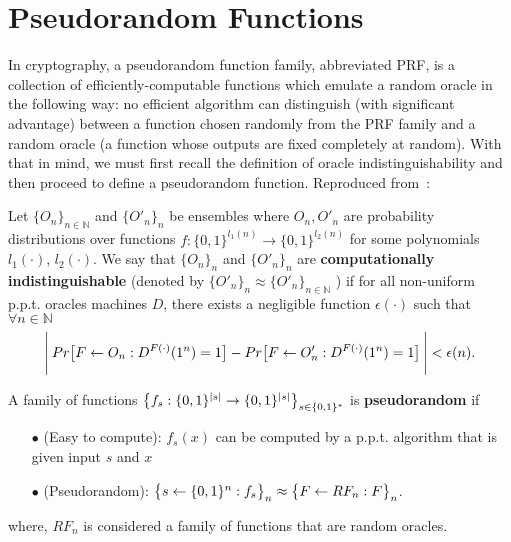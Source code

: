 \section{Pseudorandom Functions} \label{sec:PRF}
In cryptography, a pseudorandom function family, abbreviated PRF, is a collection of efficiently-computable functions which emulate a random oracle in the following way: no efficient algorithm can distinguish (with significant advantage) between a function chosen randomly from the PRF family and a random oracle (a function whose outputs are fixed completely at random). With that in mind,
we must first recall the definition of oracle indistinguishability and then proceed to define a pseudorandom function. Reproduced from~\cite{ACI}:

\begin{definition}
  Let $\{ O_n \}_{n \in \mathbb{N}}$ and $\{ O'_{n} \}_{n}$ be ensembles where $O_n, O'_n$ are probability
  distributions over functions $f: \{ 0,1 \}^{l_1(n)} \rightarrow \{ 0,1 \}^{l_2(n)}$ for some polynomials $l_1(\cdot)$, $l_2(\cdot)$. We say that $\{ O_{n} \}_{n}$ and $\{ O'_{n} \}_{n}$ are \textbf{computationally indistinguishable} (denoted by $\{ O'_{n} \}_{n} \approx \{ O'_n \}_{n \in \mathbb{N}}$
  ) if for all non-uniform p.p.t. oracles machines $D$, there exists a negligible function $\epsilon(\cdot)$ such that $\forall n \in \mathbb{N}$
  \begin{equation} \label{oracle}
    \Bigg{\lvert} \: Pr \big{[} F \leftarrow O_n : D^{F(\cdot)}(1^n)=1 \big{]} - Pr \big{[} F \leftarrow O'_n : D^{F(\cdot)}(1^n)=1 \big{]} \: \Bigg{\rvert} < \epsilon(n).
  \end{equation}
\end{definition}

\begin{definition}
  A family of functions $\big{\{} f_s: \{ 0,1 \}^{\lvert s \rvert} \rightarrow \{ 0,1 \}^{\lvert s \rvert} \big{\}}_{s \in \{ 0,1 \}^{*}}$ is \textbf{pseudorandom} if
  \begin{itemize}
    \item[$\bullet$] (Easy to compute): $f_s(x)$ can be computed by a p.p.t. algorithm that is given input $s$ and $x$
    \item[$\bullet$] (Pseudorandom): $\big{\{} s \leftarrow \{ 0,1 \}^n: f_s \big{\}}_n \approx \big{\{} F \leftarrow RF_n: F \big{\}}_n$.
  \end{itemize}
\end{definition}
\noindent where, $RF_{n}$ is considered a family of functions that are random oracles.

